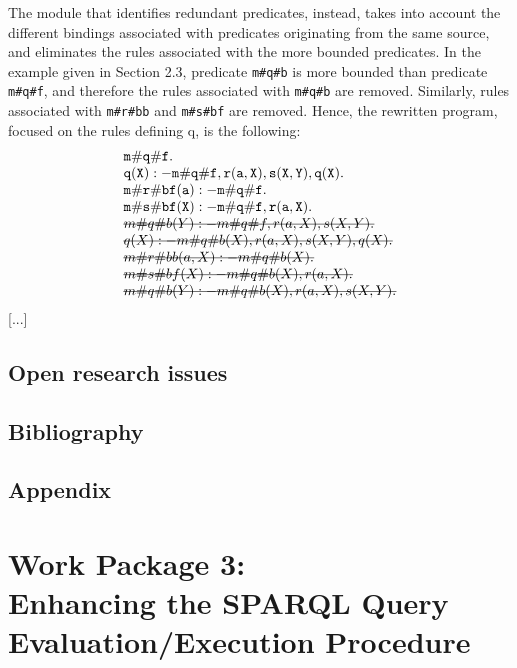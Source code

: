 \documentclass[oneside]{book}
\newcommand{\stkout}[1]{\ifmmode\text{\sout{\ensuremath{#1}}}\else\sout{#1}\fi}
\begin{document}
The module that identifies redundant predicates, instead, takes into account the different bindings associated with predicates originating from the same source, and eliminates the rules associated with the more bounded predicates. In the example given in Section 2.3, predicate {\tt m\#q\#b} is more bounded than predicate {\tt m\#q\#f}, and therefore the rules associated with {\tt m\#q\#b} are removed. Similarly, rules associated with {\tt m\#r\#bb} and {\tt m\#s\#bf} are removed. Hence, the rewritten program, focused on the rules defining q, is the following:
\[
\begin{array}{l}
	{\tt m\#q\#f.}\\
	{\tt q(X) :- m\#q\#f, r(a,X), s(X,Y), q(X).}\\
	{\tt m\#r\#bf(a) :- m\#q\#f.}\\
	{\tt m\#s\#bf(X) :- m\#q\#f, r(a,X).}\\
	\mathtt{\stkout{m\#q\#b(Y) :- m\#q\#f, r(a,X), s(X,Y).}}\\
	\mathtt{\stkout{q(X) :- m\#q\#b(X), r(a,X), s(X,Y), q(X).}}\\
	\mathtt{\stkout{m\#r\#bb(a,X) :- m\#q\#b(X).}}\\
	\mathtt{\stkout{m\#s\#bf(X) :- m\#q\#b(X), r(a,X).}}\\
	\mathtt{\stkout{m\#q\#b(Y) :- m\#q\#b(X), r(a,X), s(X,Y).}}\\
\end{array}
\]
[...]




\chapter{Open research issues}
\chapter{Bibliography}
\chapter{Appendix}


\setcounter{chapter}{0}

\part*{Work Package 3:\\Enhancing the SPARQL Query Evaluation/Execution Procedure}
\end{document}
